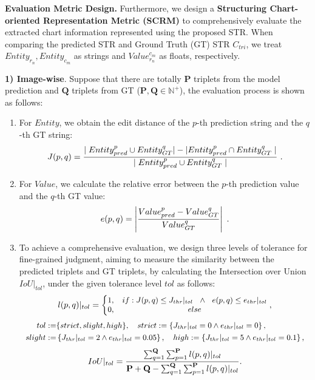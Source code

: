 \documentclass{article} \usepackage{iclr2024_conference,times}
\begin{document}
\noindent\textbf{Evaluation Metric Design.}
\label{sec:metric}
Furthermore, we design a \textbf{Structuring Chart-oriented Representation Metric (SCRM)} to comprehensively evaluate the extracted chart information represented using the proposed STR. When comparing the predicted STR and Ground Truth (GT) STR $C_{tri}$, we treat {\small $Entity_{r_n}, Entity_{c_m}$} as strings and {\small$ Value_{r_n}^{c_m}$} as floats, respectively. 

\textbf{1) Image-wise}. Suppose that there are totally {\small $\mathbf{P}$} triplets from the model prediction and {\small $\mathbf{Q}$} triplets from GT ({\small $\mathbf{P}, \mathbf{Q}\in \mathbb{{N}^+}$}), the evaluation process is shown as follows:

\begin{enumerate}[-]
\item For {\small $Entity$}, we obtain the edit distance of the $p$-th prediction string and the $q$-th GT string: 
\begin{equation}
\small
J(p,q)=\frac{\mid Entity _{pred}^p \cup Entity_{GT}^q|-| Entity_{pred}^p \cap Entity_{GT}^q \mid}{\mid Entity_{pred}^p \cup Entity_{GT}^q \mid} \ .
\end{equation}

\item For {\small $Value$}, we calculate the relative error between the $p$-th prediction value and the $q$-th GT value: 
\begin{equation}
\small
e(p,q)=\left|\frac{Value_{pred}^{p}-Value_{GT}^{q}}{Value_{GT}^q}\right| \ .
\end{equation}

\item To achieve a comprehensive evaluation, we design three levels of tolerance for fine-grained judgment, aiming to measure the similarity between the predicted triplets and GT triplets, by calculating the Intersection over Union {\small $IoU|_{tol}$}, under the given tolerance level {\small $tol$} as follows:
\begin{equation}
\small
l(p,q)|_{tol}=\left\{\begin{matrix}
 1, & if:J(p,q) \le J_{thr}|_{tol} \ \ \wedge \ \ e(p,q)\le e_{thr}|_{tol} \\
 0, & else
\end{matrix}\right.,
\end{equation}
\begin{equation}
\small
\begin{aligned}
 tol:=&\{ strict, slight, high\}, \quad
strict:=\left\{J_{thr}|_{tol}=0   \wedge   e_{thr}|_{tol}=0\right\}, \\
  slight:=& \left\{J_{thr}|_{tol}=2   \wedge  e_{thr}|_{tol}=0.05\right\}, \quad
  high:=\left\{J_{thr}|_{tol}=5   \wedge  e_{thr}|_{tol}=0.1\right\},
\end{aligned}
\end{equation}
\begin{equation}
\small
IoU|_{tol}=\frac{\sum_{q=1}^{\mathbf{Q}}\sum_{p=1}^{\mathbf{P}}l(p,q)|_{tol}}{\mathbf{P}+\mathbf{Q}-\sum_{q=1}^{\mathbf{Q}}\sum_{p=1}^{\mathbf{P}}l(p,q)|_{tol}}.
\end{equation}
\end{enumerate}
\end{document}
